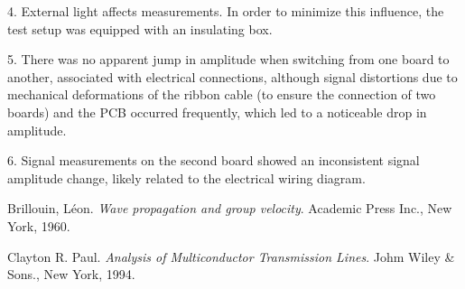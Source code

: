 \documentclass[../BTOF_summary.tex]{subfiles}
\begin{document}
4. External light affects measurements. In order to minimize this influence, the test setup was equipped with an insulating box.

5. There was no apparent jump in amplitude when switching from one board to another, associated with electrical connections, although signal distortions due to mechanical deformations of the ribbon cable (to ensure the connection of two boards) and the PCB occurred frequently, which led to a noticeable drop in amplitude.

6. Signal measurements on the second board showed an inconsistent signal amplitude change, likely related to the electrical wiring diagram.

\begin{thebibliography}{9}
Brillouin, Léon. 
\textit{Wave propagation and group velocity}. 
Academic Press Inc., New York, 1960.

Clayton R. Paul. 
\textit{Analysis of Multiconductor Transmission Lines}. 
Johm Wiley \& Sons., New York, 1994.

\end{thebibliography}
\end{document}

